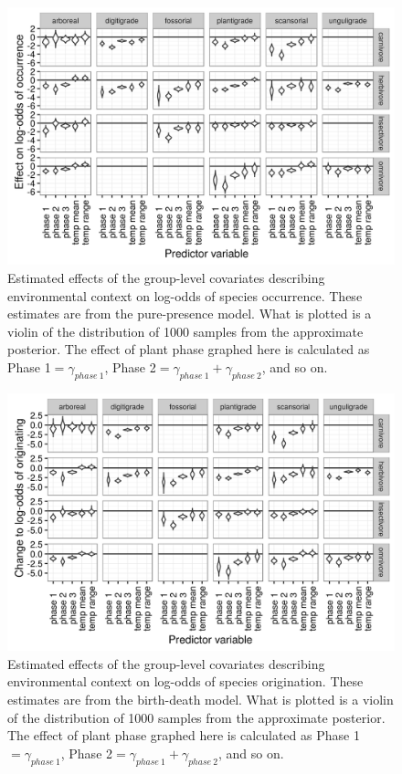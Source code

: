 \begin{figure}[ht]
  \centering
  \includegraphics[width=\textwidth,height=0.4\textheight,keepaspectratio=true]{chapter_coping/figure/group_on_ecotype}
  \caption[Effects of group-level covariates on log-odds of ecotype occurrence as estimated from the pure-presence model]{Estimated effects of the group-level covariates describing environmental context on log-odds of species occurrence. These estimates are from the pure-presence model. What is plotted is a violin of the distribution of 1000 samples from the approximate posterior. The effect of plant phase graphed here is calculated as Phase 1\( = \gamma_{phase\ 1}\), Phase 2\( = \gamma_{phase\ 1} + \gamma_{phase\ 2}\), and so on.} 
  \label{fig:group_pure_presence}
\end{figure}

\begin{figure}[ht]
  \centering
  \includegraphics[width=\textwidth,height=0.4\textheight,keepaspectratio=true]{chapter_coping/figure/group_on_origin_bd}
  \caption[Effects of group-level covariates on log-odds of ecotype origination as estimated from the birth-death model]{Estimated effects of the group-level covariates describing environmental context on log-odds of species origination. These estimates are from the birth-death model. What is plotted is a violin of the distribution of 1000 samples from the approximate posterior. The effect of plant phase graphed here is calculated as Phase 1\( = \gamma_{phase\ 1}\), Phase 2\( = \gamma_{phase\ 1} + \gamma_{phase\ 2}\), and so on.} 
  \label{fig:group_origin_bd}
\end{figure}

